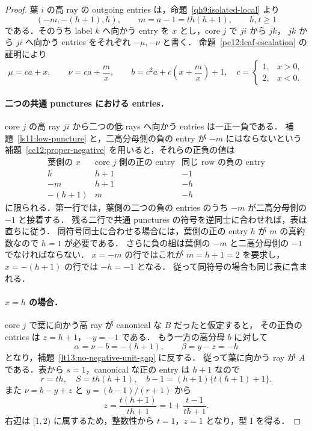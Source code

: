 \begin{proof}
葉 $i$ の高 ray の outgoing entries は，命題~\ref{qh9:isolated-local} より
\[
 (-m,-(h+1),h),\qquad m=a-1=t h(h+1),\qquad h,t\geq1
\]
である．そのうち label $k$ へ向かう entry を $x$ とし，core $j$ で $ji$ から $jk$，
$jk$ から $ji$ へ向かう entries をそれぞれ $-\mu,-\nu$ と書く．
命題~\ref{pe12:leaf-escalation} の証明により
\[
 \mu=ca+x,\qquad \nu=ca+\frac{m}{x},\qquad
 b=c^2a+c\left(x+\frac{m}{x}\right)+1,
 \quad c=\begin{cases}1,&x>0,\\2,&x<0.\end{cases}
\]

\paragraph{二つの共通 punctures における entries．}
core $j$ の高 ray $ji$ から二つの低 rays へ向かう entries は一正一負である．
補題~\ref{ls11:low-puncture} と，二高分母側の負の entry が $-m$ にはならないという
補題~\ref{cc12:proper-negative} を用いると，それらの正負の値は
\[
\begin{array}{c|rr}
 \text{葉側の }x&\text{core }j\text{ 側の正の entry}&\text{同じ row の負の entry}\\\hline
 h&h+1&-1\\
 -m&h+1&-h\\
 -(h+1)&m&-h
\end{array}
\]
に限られる．第一行では，葉側の二つの負の entries のうち $-m$ が二高分母側の $-1$ と接着する．
残る二行で共通 punctures の符号を逆同士に合わせれば，表は直ちに従う．
同符号同士に合わせる場合には，葉側の正の entry $h$ が $m$ の真約数なので $h=1$ が必要である．
さらに負の組は葉側の $-m$ と二高分母側の $-1$ でなければならない．
$x=-m$ の行ではこれが $m=h+1=2$ を要求し，$x=-(h+1)$ の行では $-h=-1$ となる．
従って同符号の場合も同じ表に含まれる．

\paragraph{$x=h$ の場合．}
core $j$ で葉に向かう高 ray が canonical な $B$ だったと仮定すると，
その正負の entries は $z=h+1$，$-y=-1$ である．
もう一方の高分母 $b$ に対して
\[
 \alpha=\nu-b=-(h+1),\qquad \beta=y-z=-h
\]
となり，補題~\ref{lt13:no-negative-unit-gap} に反する．
従って葉に向かう ray が $A$ である．表から $s=1$，canonical な正の entry は $h+1$ なので
\[
 r=t h,\quad S=t h(h+1),\quad
 b-1=(h+1)\{t(h+1)+1\}.
\]
また $\nu=b-y+z$ と $y=(b-1)/(r+1)$ から
\[
 z=\frac{t(h+1)}{t h+1}
   =1+\frac{t-1}{t h+1}.
\]
右辺は $[1,2)$ に属するため，整数性から $t=1$，$z=1$ となり，型 I を得る．


\end{proof}
